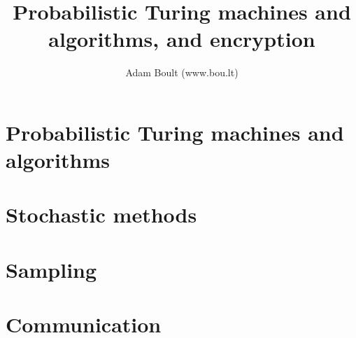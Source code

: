 \documentclass[oneside]{book}
\begin{document}
\author{Adam Boult (www.bou.lt)}
\title{Probabilistic Turing machines and algorithms, and encryption}
\maketitle

\setcounter{tocdepth}{0}
\tableofcontents



\part{Probabilistic Turing machines and algorithms}

\part{Stochastic methods}








\part{Sampling}


\part{Communication}




\end{document}

